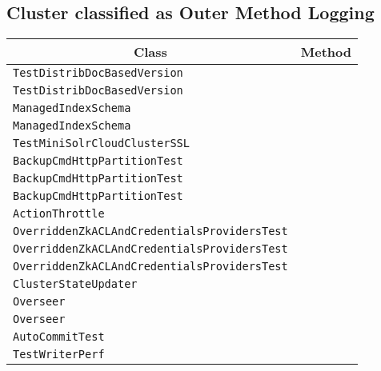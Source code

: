 \subsection{Cluster classified as Outer Method Logging}

\begin{center}
\begin{tabular}{ll}\toprule
\multicolumn{1}{c}{Class}&\multicolumn{1}{c}{Method}\\\midrule
\lstinline/TestDistribDocBasedVersion/&\raisebox{0pt}{\lstinline/vdeleteFail(String)/}\\
\lstinline/TestDistribDocBasedVersion/&\raisebox{0pt}{\lstinline/vdeleteFail(String)/}\\
\lstinline/ManagedIndexSchema/&\raisebox{0pt}{\lstinline/new()/}\\
\lstinline/ManagedIndexSchema/&\raisebox{0pt}{\lstinline/new()/}\\
\lstinline/TestMiniSolrCloudClusterSSL/&\raisebox{0pt}{\lstinline/before()/}\\
\lstinline/BackupCmdHttpPartitionTest/&\raisebox{0pt}{\lstinline/call(ClusterState)/}\\
\lstinline/BackupCmdHttpPartitionTest/&\raisebox{0pt}{\lstinline/call(ClusterState)/}\\
\lstinline/BackupCmdHttpPartitionTest/&\raisebox{0pt}{\lstinline/call(ClusterState)/}\\
\lstinline/ActionThrottle/&\raisebox{0pt}{\lstinline/minimumWaitBetweenActions()/}\\
\lstinline/OverriddenZkACLAndCredentialsProvidersTest/&\raisebox{0pt}{\lstinline/setUp()/}\\
\lstinline/OverriddenZkACLAndCredentialsProvidersTest/&\raisebox{0pt}{\lstinline/setUp()/}\\
\lstinline/OverriddenZkACLAndCredentialsProvidersTest/&\raisebox{0pt}{\lstinline/setUp()/}\\
\lstinline/ClusterStateUpdater/&\raisebox{0pt}{\lstinline/LeaderStatusamILeader()/}\\
\lstinline/Overseer/&\raisebox{0pt}{\lstinline/createOverseerNode(SolrZkClientzkClient)/}\\
\lstinline/Overseer/&\raisebox{0pt}{\lstinline/createOverseerNode(SolrZkClientzkClient)/}\\
\lstinline/AutoCommitTest/&\raisebox{0pt}{\lstinline/verbose(Object)/}\\
\lstinline/TestWriterPerf/&\raisebox{0pt}{\lstinline/doPerf()/}\\

\end{tabular}
\end{center}
